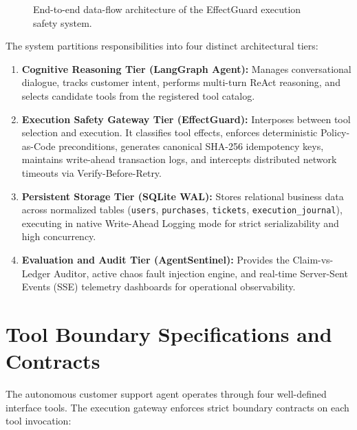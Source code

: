 \begin{figure}[H]
{
}
\caption{End-to-end data-flow architecture of the EffectGuard execution safety system.}
\label{fig:arch_overview}
\end{figure}

The system partitions responsibilities into four distinct architectural tiers:
\begin{enumerate}
    \item \textbf{Cognitive Reasoning Tier (LangGraph Agent):} Manages conversational dialogue, tracks customer intent, performs multi-turn ReAct reasoning, and selects candidate tools from the registered tool catalog.
    \item \textbf{Execution Safety Gateway Tier (EffectGuard):} Interposes between tool selection and execution. It classifies tool effects, enforces deterministic Policy-as-Code preconditions, generates canonical SHA-256 idempotency keys, maintains write-ahead transaction logs, and intercepts distributed network timeouts via Verify-Before-Retry.
    \item \textbf{Persistent Storage Tier (SQLite WAL):} Stores relational business data across normalized tables (\texttt{users}, \texttt{purchases}, \texttt{tickets}, \texttt{execution\_journal}), executing in native Write-Ahead Logging mode for strict serializability and high concurrency.
    \item \textbf{Evaluation and Audit Tier (AgentSentinel):} Provides the Claim-vs-Ledger Auditor, active chaos fault injection engine, and real-time Server-Sent Events (SSE) telemetry dashboards for operational observability.
\end{enumerate}

\section{Tool Boundary Specifications and Contracts}

The autonomous customer support agent operates through four well-defined interface tools. The execution gateway enforces strict boundary contracts on each tool invocation:

